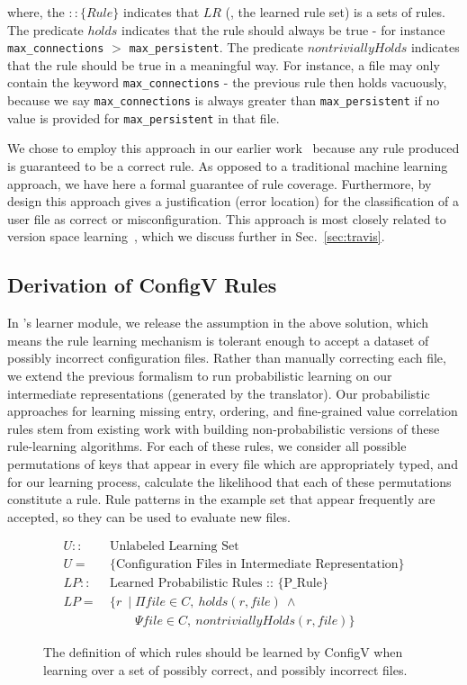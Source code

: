 where, the $:: \{Rule\}$ indicates that $LR$ (\ie, the learned rule set) 
is a sets of rules.
The predicate $holds$ indicates that the rule should always be true -
  for instance {\tt max\_connections} $>$ {\tt max\_persistent}.
The predicate $nontriviallyHolds$ indicates that the rule should be true in a meaningful way.
For instance, a file may only contain the keyword {\tt max\_connections} - the previous rule then holds vacuously,
 because we say {\tt max\_connections} is always greater than {\tt max\_persistent} if no value is provided for {\tt max\_persistent} in that file.

We chose to employ this approach in our earlier work~\cite{santolucitoCAV} because any rule produced is guaranteed to be a correct rule.
As opposed to a traditional machine learning approach, we have here a formal guarantee of rule coverage.
Furthermore, by design this approach gives a justification (error location) for the classification of a user file as correct or misconfiguration.
This approach is most closely related to version space learning~\cite{mitchell77}, which we discuss further in Sec.~\ref{sec:travis}.

\subsection{Derivation of ConfigV Rules}
In \app's learner module, we release the assumption in the above
solution, which means the rule learning mechanism is tolerant 
enough to accept a dataset of possibly incorrect configuration files.
Rather than manually correcting each file, 
we extend the previous formalism to run probabilistic learning
on our intermediate representations (generated by the translator).
Our probabilistic approaches for learning missing entry, 
ordering, and fine-grained value correlation rules stem 
from existing work with building 
non-probabilistic versions of these rule-learning algorithms. 
For each of these rules, 
we consider all possible permutations of keys that appear in every 
file which are appropriately typed, and for our learning process, calculate the likelihood that each of 
these permutations constitute a rule. 
Rule patterns in the example set that appear frequently are accepted,
so they can be used to evaluate new files.


\begin{figure}[!h]
\begin{small}
\belowdisplayskip=-15pt
\abovedisplayskip=-2pt
\begin{align*}
U ::&\ \text{Unlabeled Learning Set}\\
U =&\ \text{\{Configuration Files in Intermediate Representation\}}\\
LP ::&\ \text{Learned Probabilistic Rules :: \{P\_Rule\}}\\
LP =&\ \{ r\ \mid \Pi file \in C,\ holds(r,file)\ \land \\
&\qquad  \ \Psi file \in C,\ nontriviallyHolds(r,file)\} 
\end{align*}
\end{small}
\caption{The definition of which rules should be learned by ConfigV when learning over a set of possibly correct, and possibly incorrect files.}
\label{fig:configV}
\end{figure}

